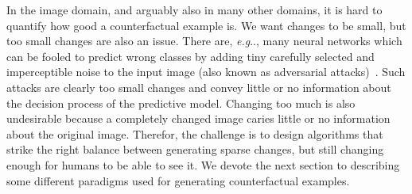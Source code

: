 \documentclass[11pt,a4paper,twoside,openright,final]{memoir}
\makeatletter
\DeclareRobustCommand\onedot{\futurelet\@let@token\@onedot}
\def\@onedot{\ifx\@let@token.\else.\null\fi\xspace}
\def\eg{\emph{e.g}\onedot} \def\Eg{\emph{E.g}\onedot}
\makeatother
\begin{document}
In the image domain, and arguably also in many other domains, it is hard to quantify how good a counterfactual example is.
We want changes to be small, but too small changes are also an issue. 
There are, \eg, many neural networks which can be fooled to predict wrong classes by adding tiny carefully selected and imperceptible noise to the input image (also known as adversarial attacks)~\cite{su2019one}. 
Such attacks are clearly too small changes and convey little or no information about the decision process of the predictive model. 
Changing too much is also undesirable because a completely changed image caries little or no information about the original image.
Therefor, the challenge is to design algorithms that strike the right balance between generating sparse changes, but still changing enough for humans to be able to see it. 
We devote the next section to describing some different paradigms used for generating counterfactual examples.



\end{document}
